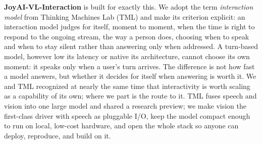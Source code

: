 \documentclass{llmxive}
\begin{document}

\textbf{JoyAI-VL-Interaction} is built for exactly this. We adopt the term \textit{interaction model} \cite{thinkingmachines2026interactionmodels} from Thinking Machines Lab (TML) and make its criterion explicit: an interaction model judges for itself, moment to moment, when the time is right to respond to the ongoing stream, the way a person does, choosing when to speak and when to stay silent rather than answering only when addressed. A turn-based model, however low its latency or native its architecture, cannot choose its own moment: it speaks only when a user's turn arrives. The difference is not how fast a model answers, but whether it decides for itself when answering is worth it. We and TML recognized at nearly the same time that interactivity is worth scaling as a capability of its own; where we part is the route to it. TML fuses speech and vision into one large model and shared a research preview; we make vision the first-class driver with speech as pluggable I/O, keep the model compact enough to run on local, low-cost hardware, and open the whole stack so anyone can deploy, reproduce, and build on it.
\end{document}
